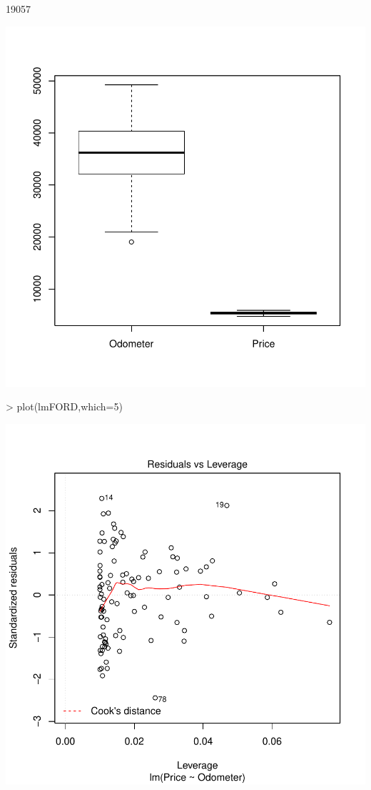 \documentclass{article}
\begin{document}
\begin{enumerate}
\begin{enumerate}[a]
\begin{Schunk}
\begin{Soutput}
[1] 19057
\end{Soutput}
\end{Schunk}
\includegraphics{Homework2-006}

\begin{Schunk}
\begin{Sinput}
> plot(lmFORD,which=5)
\end{Sinput}
\end{Schunk}
\includegraphics{Homework2-007}


\end{enumerate}
\end{enumerate}
\end{document}
